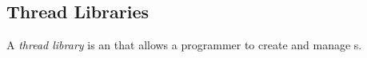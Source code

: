 \subsection{Thread Libraries}\label{subsec:Thread_Libraries}
\begin{definition}\label{def:Thread_Library}
  A \emph{thread library} is an  that allows a programmer to create and manage s.
\end{definition}


